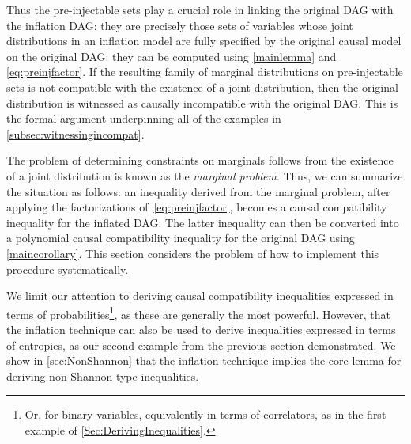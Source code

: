 {Thus the pre-injectable sets play a crucial role in linking the original DAG with the inflation DAG: they are precisely those sets of variables whose joint distributions in an inflation model are fully specified by the original causal model on the original DAG: they can be computed using \cref{mainlemma} and \cref{eq:preinjfactor}. If the resulting family of marginal distributions on pre-injectable sets is not compatible with the existence of a joint distribution, then the original distribution is witnessed as causally incompatible with the original DAG. This is the formal argument underpinning all of the examples in \cref{subsec:witnessingincompat}.

The problem of determining constraints on marginals follows from the existence of a joint distribution is known as the {\em marginal problem}. Thus, we can summarize the situation as follows: an inequality derived from the marginal problem, after applying the factorizations of~\cref{eq:preinjfactor}, becomes a causal compatibility inequality for the inflated DAG. The latter inequality can then be converted into a polynomial causal compatibility inequality for the original DAG using \cref{maincorollary}.
This section considers the problem of how to implement this procedure systematically.




We limit our attention to deriving causal compatibility inequalities expressed in terms of probabilities\footnote{Or, for binary variables, equivalently in terms of correlators, as in the first example of \cref{Sec:DerivingInequalities}.}, as these are generally the most powerful. However, that the inflation technique can also be used to derive inequalities expressed in terms of entropies, as our second example from the previous section demonstrated. We show in \cref{sec:NonShannon} that the inflation technique implies the core lemma for deriving non-Shannon-type inequalities.

}
